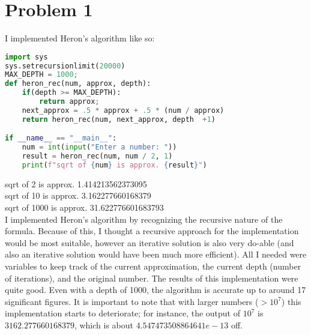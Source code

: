 \documentclass{article}
\title{\thetitle}
\author{\theauthor}
\begin{document}
\maketitle

\section*{Problem 1}
I implemented Heron's algorithm like so:
\begin{lstlisting}[language=Python]
import sys
sys.setrecursionlimit(20000)
MAX_DEPTH = 1000;
def heron_rec(num, approx, depth):
    if(depth >= MAX_DEPTH):
        return approx;
    next_approx = .5 * approx + .5 * (num / approx)
    return heron_rec(num, next_approx, depth  +1)

if __name__ == "__main__":
    num = int(input("Enter a number: "))
    result = heron_rec(num, num / 2, 1)
    print(f"sqrt of {num} is approx. {result}")
\end{lstlisting}
sqrt of 2 is approx. 1.414213562373095 \\
sqrt of 10 is approx. 3.162277660168379 \\
sqrt of 1000 is approx. 31.622776601683793 \\
I implemented Heron's algorithm by recognizing the recursive nature of the formula. Because of this, I thought a recursive approach for the implementation would be most suitable, however an iterative solution is also very do-able (and also an iterative solution would have been much more efficient). All I needed were variables to keep track of the current approximation, the current depth (number of iterations), and the original number. The results of this implementation were quite good. Even with a depth of 1000, the algorithm is accurate up to around 17 significant figures. It is important to note that with larger numbers ($> 10^7$) this implementation starts to deteriorate; for instance, the output of $10^7$ is $3162.277660168379$, which is about $4.547473508864641e-13$ off.\\
\end{document}
